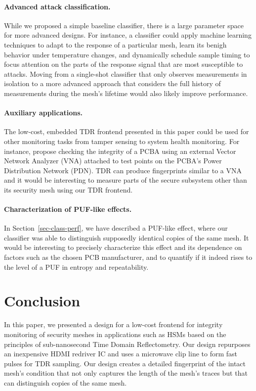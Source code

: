 \documentclass[final]{iacrtrans}
\begin{document}
\paragraph{Advanced attack classification.} While we proposed a simple baseline classifier, there is a large parameter
space for more advanced designs. For instance, a classifier could apply machine learning techniques to adapt to the
response of a particular mesh, learn its benigh behavior under temperature changes, and dynamically schedule sample
timing to focus attention on the parts of the response signal that are most susceptible to attacks. Moving from a
single-shot classifier that only observes measurements in isolation to a more advanced approach that considers the full
history of measurements during the mesh's lifetime would also likely improve performance.

\paragraph{Auxiliary applications.} The low-cost, embedded TDR frontend presented in this paper could be used for other
monitoring tasks from tamper sensing to system health monitoring. For instance,
\textcite{vaiSecureArchitectureEmbedded2015} propose checking the integrity of a PCBA using an external Vector Network
Analyzer (VNA) attached to test points on the PCBA's Power Distribution Network (PDN). TDR can produce fingerprints
similar to a VNA and it would be interesting to measure parts of the secure subsystem other than its security mesh using
our TDR frontend.

\paragraph{Characterization of PUF-like effects.} In Section~\ref{sec-class-perf}, we have described a PUF-like effect,
where our classifier was able to distinguish supposedly identical copies of the same mesh. It would be interesting to
precisely characterize this effect and its dependence on factors such as the chosen PCB manufacturer, and to quantify if
it indeed rises to the level of a PUF in entropy and repeatability.

\section{Conclusion}

In this paper, we presented a design for a low-cost frontend for integrity monitoring of security meshes in applications
such as HSMs based on the principles of sub-nanosecond Time Domain Reflectometry. Our design repurposes an inexpensive
HDMI redriver IC and uses a microwave clip line to form fast pulses for TDR sampling. Our design creates a detailed
fingerprint of the intact mesh's condition that not only captures the length of the mesh's traces but that can
distinguish copies of the same mesh.
\end{document}
